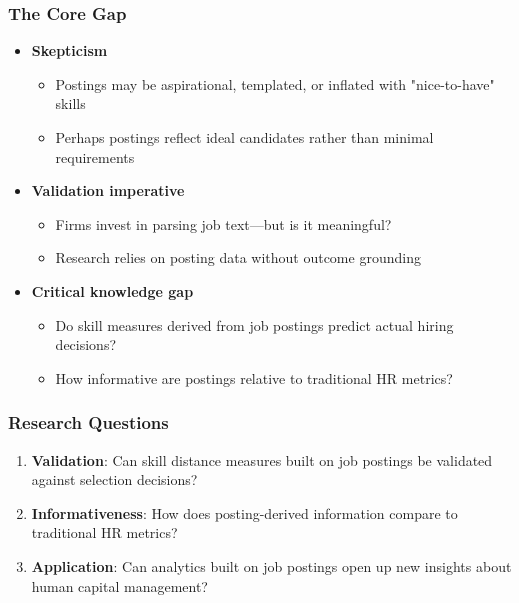 \documentclass[11pt,xcolor={dvipsnames},hyperref={pdftex,pdfpagemode=UseNone,hidelinks,pdfdisplaydoctitle=true},usepdftitle=false]{beamer}
\begin{document}
\begin{frame}
\frametitle{The Core Gap}
\begin{itemize}
\item \textbf{Skepticism}
  \begin{itemize}
  \item Postings may be aspirational, templated, or inflated with "nice-to-have" skills
  \item Perhaps postings reflect ideal candidates rather than minimal requirements
  \end{itemize}

\item \textbf{Validation imperative}
  \begin{itemize}
  \item Firms invest in parsing job text—but is it meaningful?
  \item Research relies on posting data without outcome grounding
  \end{itemize}

\item \textbf{Critical knowledge gap}
  \begin{itemize}
  \item Do skill measures derived from job postings predict actual hiring decisions?
  \item How informative are postings relative to traditional HR metrics?
  \end{itemize}
\end{itemize}
\end{frame}

\begin{frame}
\frametitle{Research Questions}
\begin{enumerate}
\item \textbf{Validation}: Can skill distance measures built on job postings be validated against selection decisions?

\item \textbf{Informativeness}: How does posting-derived information compare to traditional HR metrics?

\item \textbf{Application}: Can analytics built on job postings open up new insights about human capital management?
\end{enumerate}
\end{frame}

\end{document}
